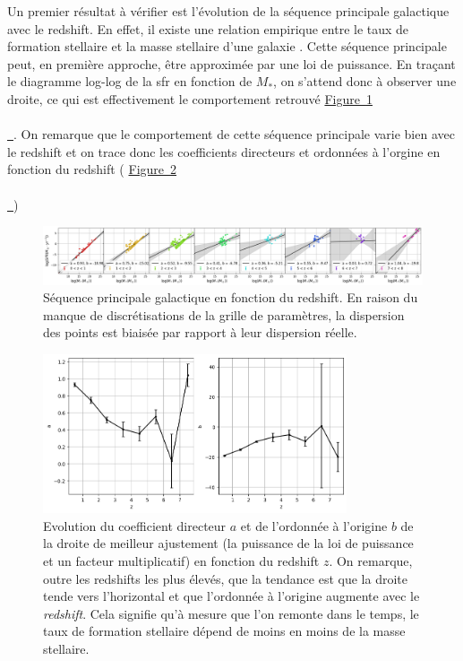 \documentclass[12pt, a4paper]{article}
\newcommand*{\figref}[2][]{%
  \hyperref[{#2}]{%
    Figure~\ref*{#2}%
    \ifx\\#1\\%
    \else
      \,#1%
    \fi
  }%
}
\begin{document}
Un premier résultat à vérifier est l'évolution de la séquence principale galactique avec le redshift. En effet, il existe une relation empirique entre le taux de formation stellaire et la masse stellaire d'une galaxie \parencite{2007ApJ...660L..43N}. Cette séquence principale peut, en première approche, être approximée par une loi de puissance. En traçant le diagramme log-log de la \gls{sfr} en fonction de $M_*$, on s'attend donc à observer une droite, ce qui est effectivement le comportement retrouvé \figref{fig:main_sequence}. On remarque que le comportement de cette séquence principale varie bien avec le redshift \parencite{10.1093_mnras_stac3214} et on trace donc les coefficients directeurs et ordonnées à l'orgine en fonction du redshift (\figref{fig:coeff_main_sequence})

\begin{figure}[!h]
  \centering
  \includegraphics[width=1\textwidth]{assets/main_sequence_redshift.png}
  \caption{Séquence principale galactique en fonction du redshift. En raison du manque de discrétisations de la grille de paramètres, la dispersion des points est biaisée par rapport à leur dispersion réelle.}
  \label{fig:main_sequence}
\end{figure}

\begin{figure}[!h]
  \centering
  \includegraphics[width=0.8\textwidth]{assets/coeff_main_sequence.png}
  \caption{Evolution du coefficient directeur $a$ et de l'ordonnée à l'origine $b$ de la droite de meilleur ajustement (la puissance de la loi de puissance et un facteur multiplicatif) en fonction du redshift $z$. On remarque, outre les redshifts les plus élevés, que la tendance est que la droite tende vers l'horizontal et que l'ordonnée à l'origine augmente avec le \textit{redshift}. Cela signifie qu'à mesure que l'on remonte dans le temps, le taux de formation stellaire dépend de moins en moins de la masse stellaire.}
  \label{fig:coeff_main_sequence}
\end{figure}
\end{document}
